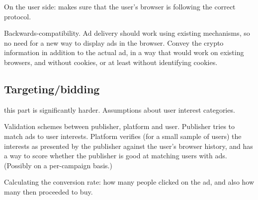 On the user side: makes sure that the user's browser is following the correct protocol.

Backwards-compatibility.  Ad delivery should work using existing mechanisms, so no need for a new way to display ads in the browser.
Convey the crypto information in addition to the actual ad, in a way that would work on existing browsers, and without cookies, or at least without identifying cookies.



\subsection{Targeting/bidding}

this part is significantly harder.  Assumptions about user interest categories.  

Validation schemes between publisher, platform and user.  Publisher tries to match ads to user interests.  Platform verifies (for a small sample of users) the interests as presented by the publisher against the user's browser history, and has a way to score whether the publisher is good at matching users with ads.  (Possibly on a per-campaign basis.)

Calculating the conversion rate: how many people clicked on the ad, and also how many then proceeded to buy.  